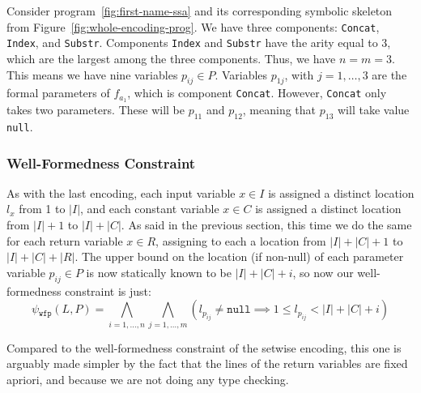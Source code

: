 \begin{example}
  Consider program~\ref{fig:first-name-ssa} and its corresponding symbolic
  skeleton from Figure~\ref{fig:whole-encoding-prog}.
  We have three components: \lstinline{Concat}, \lstinline{Index}, and
  \lstinline{Substr}.
  Components \lstinline{Index} and \lstinline{Substr} have the arity equal to 3,
  which are the largest among the three components.
  Thus, we have $n = m = 3$. This means we have nine variables $p_{ij} \in P$.
  Variables $p_{1j}$, with $j = 1, \ldots, 3$ are the formal parameters of
  $f_{a_1}$, which is component \lstinline{Concat}.
  However, \lstinline{Concat} only takes two parameters.
  These will be $p_{11}$ and $p_{12}$, meaning that $p_{13}$ will take value
  \lstinline{null}.
\end{example}

\subsubsection{Well-Formedness Constraint}
\label{sec:whole-well-formedness-constraint}

As with the last encoding, each input variable $x \in I$ is assigned a distinct
location $l_x$ from 1 to $|I|$, and each constant variable $x \in C$ is assigned
a distinct location from $|I| + 1$ to $|I| + |C|$.
As said in the previous section, this time we do the same for each return
variable $x \in R$, assigning to each a location from $|I| + |C| + 1$ to
$|I| + |C| + |R|$.
The upper bound on the location (if non-null) of each parameter variable $p_{ij}
\in P$ is now statically known to be $|I| + |C| + i$, so now our well-formedness
constraint is just:
%
\[
  \psi{}_{\mathtt{wfp}}(L, P) =
  \bigwedge_{i = 1, \ldots, n}\bigwedge_{j = 1, \ldots, m}
  (l_{p_{ij}} \neq \mathtt{null} \implies 1 \leq l_{p_{ij}} < |I| + |C| + i)
\]

\noindent
Compared to the well-formedness constraint of the setwise encoding, this one is
arguably made simpler by the fact that the lines of the return variables are
fixed apriori, and because we are not doing any type checking.

